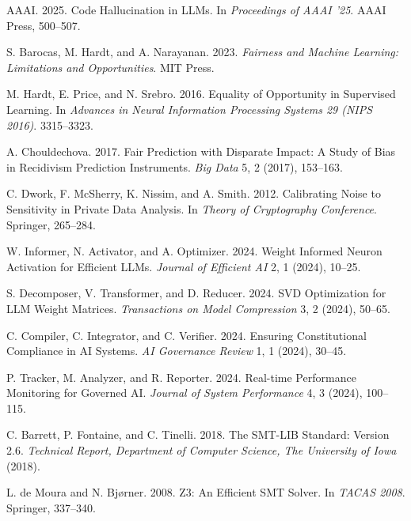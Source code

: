 \documentclass[manuscript,screen,review,anonymous,9pt]{acmart}
\begin{document}
\begin{thebibliography}{99}
AAAI. 2025.
\newblock Code Hallucination in LLMs.
\newblock In \emph{Proceedings of AAAI '25}. AAAI Press, 500--507.

S. Barocas, M. Hardt, and A. Narayanan. 2023.
\newblock \emph{Fairness and Machine Learning: Limitations and Opportunities}.
\newblock MIT Press.

M. Hardt, E. Price, and N. Srebro. 2016.
\newblock Equality of Opportunity in Supervised Learning.
\newblock In \emph{Advances in Neural Information Processing Systems 29 (NIPS 2016)}. 3315--3323.

A. Chouldechova. 2017.
\newblock Fair Prediction with Disparate Impact: A Study of Bias in Recidivism Prediction Instruments.
\newblock \emph{Big Data} 5, 2 (2017), 153--163.

C. Dwork, F. McSherry, K. Nissim, and A. Smith. 2012.
\newblock Calibrating Noise to Sensitivity in Private Data Analysis.
\newblock In \emph{Theory of Cryptography Conference}. Springer, 265--284.

W. Informer, N. Activator, and A. Optimizer. 2024.
\newblock Weight Informed Neuron Activation for Efficient LLMs.
\newblock \emph{Journal of Efficient AI} 2, 1 (2024), 10--25.

S. Decomposer, V. Transformer, and D. Reducer. 2024.
\newblock SVD Optimization for LLM Weight Matrices.
\newblock \emph{Transactions on Model Compression} 3, 2 (2024), 50--65.

C. Compiler, C. Integrator, and C. Verifier. 2024.
\newblock Ensuring Constitutional Compliance in AI Systems.
\newblock \emph{AI Governance Review} 1, 1 (2024), 30--45.

P. Tracker, M. Analyzer, and R. Reporter. 2024.
\newblock Real-time Performance Monitoring for Governed AI.
\newblock \emph{Journal of System Performance} 4, 3 (2024), 100--115.

C. Barrett, P. Fontaine, and C. Tinelli. 2018.
\newblock The SMT-LIB Standard: Version 2.6.
\newblock \emph{Technical Report, Department of Computer Science, The University of Iowa} (2018).

L. de Moura and N. Bjørner. 2008.
\newblock Z3: An Efficient SMT Solver.
\newblock In \emph{TACAS 2008}. Springer, 337--340.


\end{thebibliography}
\end{document}
